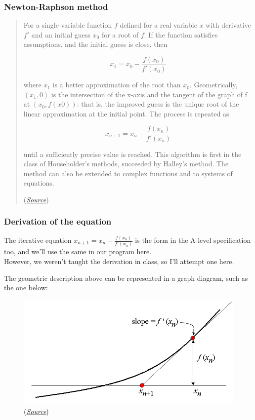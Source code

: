\documentclass[
]{article}
\begin{document}
\hypertarget{header-n9}{%
\subsubsection{Newton-Raphson method}\label{header-n9}}

\begin{quote}
For a single-variable function \(f\) defined for a real variable \(x\)
with derivative \(f'\) and an initial guess \(x_0\) for a root of \(f\).
If the function satisfies assumptions, and the initial guess is close,
then

\[x_1 = x_0 - \frac{f(x_0)}{f'(x_0)}\]

where \(x_1\) is a better approximation of the root than \(x_0\).
Geometrically, \((x_1, 0)\) is the intersection of the x-axis and the
tangent of the graph of f at \((x_0, f(x0))\): that is, the improved
guess is the unique root of the linear approximation at the initial
point. The process is repeated as

\[x_{n+1} = x_n - \frac{f(x_n)}{f'(x_n)}\]

until a sufficiently precise value is reached. This algorithm is first
in the class of Householder's methods, succeeded by Halley's method. The
method can also be extended to complex functions and to systems of
equations.

(\href{https://en.wikipedia.org/wiki/Newton's_method}{\emph{Source}})
\end{quote}

\hypertarget{header-n18}{%
\subsubsection{Derivation of the equation}\label{header-n18}}

The iterative equation \(x_{n+1} = x_n - \frac{f(x_n)}{f'(x_n)}\) is the
form in the A-level specification too, and we'll use the same in our
program here.\\
However, we weren't taught the derivation in class, so I'll attempt one
here.

The geometric description above can be represented in a graph diagram,
such as the one below:
\begin{figure}
\centering
\includegraphics[width=0.7\columnwidth]{./diagram_1.png}
(\href{https://brilliant.org/wiki/newton-raphson-method/}{\emph{Source}})
\end{figure}
\end{document}

